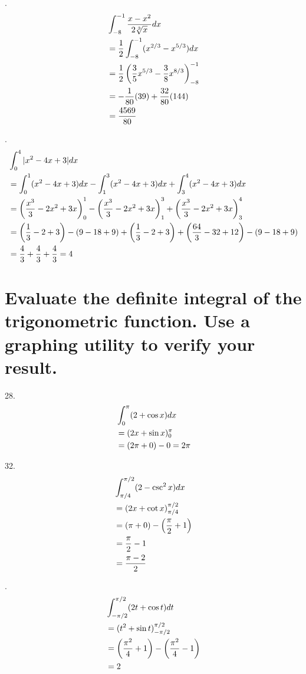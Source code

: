 \documentclass[11pt]{article}
\newcommand*{\vs}{\vspace{1cm}}
\newcommand*{\next}{\noindent}
\newcommand*{\set}{\setcounter{equation}{0}}
\begin{document}
\vs\next
22.\begin{align}
    \set
    &\int_{-8}^{-1}\frac{x-x^2}{2\sqrt[3]{x}}dx\\
    &=\frac{1}{2}\int_{-8}^{-1}(x^{2/3}-x^{5/3})dx\\
    &=\frac{1}{2}\left(\frac{3}{5}x^{5/3}-\frac{3}{8}x^{8/3}\right)_{-8}^{-1}\\
    &=-\frac{1}{80}(39)+\frac{32}{80}(144)\\
    &=\frac{4569}{80}
\end{align}

\vs\next
26.\begin{align}
    \set
    &\int_{0}^{4}|x^2-4x+3|dx\\
    &=\int_{0}^{1}(x^2-4x+3)dx-\int_{1}^{3}(x^2-4x+3)dx+\int_{3}^{4}(x^2-4x+3)dx\\
    &=\left(\frac{x^3}{3}-2x^2+3x\right)_0^1-\left(\frac{x^3}{3}-2x^2+3x\right)_1^3+\left(\frac{x^3}{3}-2x^2+3x\right)_3^4\\
    &=\left(\frac{1}{3}-2+3\right)-(9-18+9)+\left(\frac{1}{3}-2+3\right)+\left(\frac{64}{3}-32+12\right)-(9-18+9)\\
    &=\frac{4}{3}+\frac{4}{3}+\frac{4}{3}=4
\end{align}

\section{Evaluate the definite integral of the trigonometric function. Use a graphing utility to verify your result.}
28.\begin{align}
    \set
    &\int_{0}^{\pi}(2+\cos x)dx\\
    &=(2x+\sin x)_0^{\pi}\\
    &=(2\pi+0)-0=2\pi
\end{align}

32.\begin{align}
    \set
    &\int_{\pi/4}^{\pi/2}(2-\csc^2x)dx\\
    &=(2x+\cot x)_{\pi/4}^{\pi/2}\\
    &=(\pi+0)-\left(\frac{\pi}{2}+1\right)\\
    &=\frac{\pi}{2}-1\\
    &=\frac{\pi-2}{2}
\end{align}

\vs\next
34.\begin{align}
    \set
    &\int_{-\pi/2}^{\pi/2}(2t+\cos t)dt\\
    &=(t^2+\sin t)_{-\pi/2}^{\pi/2}\\
    &=\left(\frac{\pi^2}{4}+1\right)-\left(\frac{\pi^2}{4}-1\right)\\
    &=2
\end{align}
\end{document}
